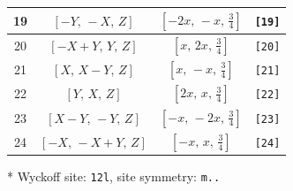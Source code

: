 \documentclass[fleqn,8pt]{jsarticle}
\begin{document}
\begin{longtable}{cccc}
19 & $\left[ - Y,\, - X,\, Z \right]$ & $\left[ - 2 x,\, - x,\, \frac{3}{4} \right]$ & {\tt [19]} \\ \hline
20 & $\left[ - X + Y,\, Y,\, Z \right]$ & $\left[ x,\, 2 x,\, \frac{3}{4} \right]$ & {\tt [20]} \\ \hline
21 & $\left[ X,\, X - Y,\, Z \right]$ & $\left[ x,\, - x,\, \frac{3}{4} \right]$ & {\tt [21]} \\ \hline
22 & $\left[ Y,\, X,\, Z \right]$ & $\left[ 2 x,\, x,\, \frac{3}{4} \right]$ & {\tt [22]} \\ \hline
23 & $\left[ X - Y,\, - Y,\, Z \right]$ & $\left[ - x,\, - 2 x,\, \frac{3}{4} \right]$ & {\tt [23]} \\ \hline
24 & $\left[ - X,\, - X + Y,\, Z \right]$ & $\left[ - x,\, x,\, \frac{3}{4} \right]$ & {\tt [24]} \\
\end{longtable}
* Wyckoff site: {\tt 12l}, site symmetry: {\tt m..}
\renewcommand{\arraystretch}{1.2}
\end{document}
